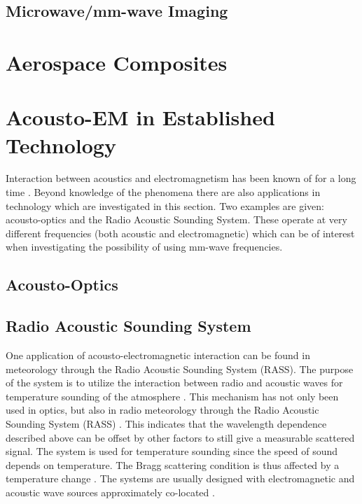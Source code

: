 \documentclass[11pt,twoside]{eitExjobb}
\begin{document}
	\subsection{Microwave/mm-wave Imaging}
	
	\section{Aerospace Composites}
	
	\section{Acousto-EM in Established Technology}
	Interaction between acoustics and electromagnetism has been known of for a long time \addref. Beyond knowledge of the phenomena there are also applications in technology which are investigated in this section. Two examples are given: acousto-optics and the Radio Acoustic Sounding System. These operate at very different frequencies (both acoustic and electromagnetic) which can be of interest when investigating the possibility of using mm-wave frequencies.
	
	\subsection{Acousto-Optics}
	
	\subsection{Radio Acoustic Sounding System}
	One application of acousto-electromagnetic interaction can be found in meteorology through the Radio Acoustic Sounding System (RASS). The purpose of the system is to utilize the interaction between radio and acoustic waves for temperature sounding of the atmosphere .
	This mechanism has not only been used in optics, but also in radio meteorology through the Radio Acoustic Sounding System (RASS) \cite{Buerkle2007}. This indicates that the wavelength dependence described above can be offset by other factors to still give a measurable scattered signal. The system is used for temperature sounding since the speed of sound depends on temperature. The Bragg scattering condition is thus affected by a temperature change \cite{Marshall1972}. The systems are usually designed with electromagnetic and acoustic wave sources approximately co-located \cite{Marshall1972}.
	
\end{document}
